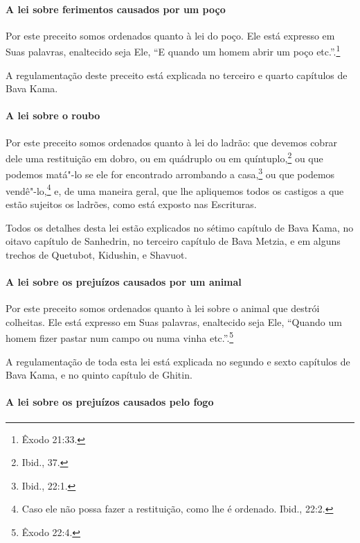 \begin{multicols}{2}
\paragraph{A lei sobre ferimentos causados por um poço}

Por este preceito somos ordenados quanto à lei do poço. Ele está
expresso em Suas palavras, enaltecido seja Ele, ``E quando um homem
abrir um poço etc.''.\footnote{Êxodo 21:33.}

A regulamentação deste preceito está explicada no terceiro e quarto
capítulos de Bava Kama\starr.


\paragraph{A lei sobre o roubo}

Por este preceito somos ordenados quanto à lei do ladrão: que devemos
cobrar dele uma restituição em dobro, ou em quádruplo ou em
quíntuplo,\footnote{Ibid., 37.} ou que podemos matá"-lo se ele for
encontrado arrombando a casa,\footnote{Ibid., 22:1.} ou que podemos
vendê"-lo,\footnote{Caso ele não possa fazer a restituição, como lhe é ordenado. Ibid.,
  22:2.} e, de uma maneira geral, que lhe
apliquemos todos os castigos a que estão sujeitos os ladrões, como está
exposto nas Escrituras.

Todos os detalhes desta lei estão explicados no sétimo capítulo de Bava
Kama\starr, no oitavo capítulo de Sanhedrin\starr, no terceiro capítulo de Bava
Metzia\starr, e em alguns trechos de Quetubot\starr, Kidushin\starr, e Shavuot\starr.

\paragraph{A lei sobre os prejuízos causados por um animal}

Por este preceito somos ordenados quanto à lei sobre o animal que
destrói colheitas. Ele está expresso em Suas palavras, enaltecido seja
Ele, ``Quando um homem fizer pastar num campo ou numa vinha etc.''.\footnote{Êxodo 22:4.}

A regulamentação de toda esta lei está explicada no segundo e sexto
capítulos de Bava Kama\starr, e no quinto capítulo de Ghitin.


\paragraph{A lei sobre os prejuízos causados pelo fogo}


\end{multicols}
